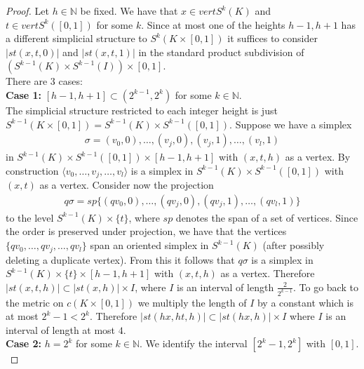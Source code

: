 \documentclass[a4paper,11pt]{article}
\theoremstyle{definition}
\theoremstyle{plain}
\theoremstyle{remark}
\begin{document}
\begin{proof} Let $h\in \mathbb{N}$ be fixed. We have that $x \in vert S^{k}(K)$ and $t \in vert S^{k}([0,1])$ for some $k$. Since at most one of the heights $h-1,h+1$ has a different simplicial structure to $S^{k}(K\times [0,1])$ it suffices to consider $|st(x,t,0)|$ and $|st(x,t,1)|$ in the standard product subdivision of $(S^{k-1}(K) \times S^{k-1}(I)) \times [0,1]$. \\

There are $3$ cases:\\

\textbf{Case 1:} $[h-1,h+1] \subset (2^{k-1},2^{k})$ for some $k\in \mathbb{N}$.\\

The simplicial structure restricted to each integer height is just $S^{k-1}(K \times [0,1]) = S^{k-1}(K) \times S^{k-1}([0,1])$. Suppose we have a simplex 
 \begin{align*}
\sigma = (v_0,0),\dots,(v_{j},0), (v_{j},1), \dots, (v_{l},1)
\end{align*}
in $S^{k-1}(K) \times S^{k-1}([0,1]) \times [h-1,h+1]$ with $(x,t,h)$ as a vertex. By construction $\langle v_{0},\dots,v_{j},\dots, v_{l}\rangle$ is a simplex in $S^{k-1}(K) \times S^{k-1}([0,1])$ with $(x,t)$ as a vertex. Consider now the projection 
\begin{align*}
q\sigma = sp\{(qv_0,0),\dots,(qv_{j},0), (qv_{j},1), \dots, (qv_{l},1)\}
\end{align*}
to the level $S^{k-1}(K) \times \{t\}$, where $sp$ denotes the span of a set of vertices. Since the order is preserved under projection, we have that the vertices $\{qv_{0},\dots,qv_{j},\dots, qv_{l}\}$ span an oriented simplex in $S^{k-1}(K)$ (after possibly deleting a duplicate vertex). From this it follows that $q\sigma$ is a simplex in $S^{k-1}(K) \times \{t\} \times [h-1,h+1]$ with $(x,t,h)$ as a vertex. Therefore $|st(x,t,h)| \subset |st(x,h)| \times I$, where $I$ is an interval of length $\frac{2}{2^{k-1}}$. To go back to the metric on $c(K \times [0,1])$ we multiply the length of $I$ by a constant which is at most $2^{k}-1<2^{k}$. Therefore $|st(hx,ht,h)| \subset |st(hx,h)| \times I$ where $I$ is an interval of length at most $4$. \\

\textbf{Case 2:} $h = 2^{k}$ for some $k\in \mathbb{N}$. We identify the interval $[2^{k}-1,2^k]$ with $[0,1]$. \\


\end{proof}
\end{document}
